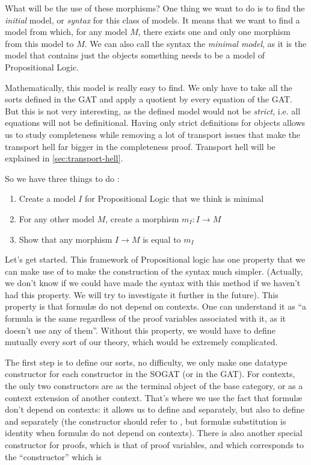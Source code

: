 \documentclass[10pt,a4paper]{article}
\begin{document}
			What will be the use of these morphisms? One thing we want to do is to find the \emph{initial} model, or \emph{syntax} for this class of models. It means that we want to find a model from which, for any model $M$, there exists one and only one morphism from this model to $M$. We can also call the syntax the \emph{minimal model}, as it is the model that contains just the objects something needs to be a model of Propositional Logic.
			
			Mathematically, this model is really easy to find. We only have to take all the sorts defined in the GAT and apply a quotient by every equation of the GAT. But this is not very interesting, as the defined model would not be \emph{strict}, i.e. all equations will not be definitional. Having only strict definitions for objects allows us to study completeness while removing a lot of transport issues that make the transport hell far bigger in the completeness proof. Transport hell will be explained in \autoref{sec:transport-hell}.
			
			So we have three things to do :
			\begin{enumerate}
				\setlength{\itemsep}{-1ex}
				\item Create a model $I$ for Propositional Logic that we think is minimal
				\item For any other model $M$, create a morphism $m_I : I \to M$
				\item Show that any morphism $I \to M$ is equal to $m_I$
			\end{enumerate}
		
			Let's get started. This framework of Propositional logic has one property that we can make use of to make the construction of the syntax much simpler. (Actually, we don't know if we could have made the syntax with this method if we haven't had this property. We will try to investigate it further in the future). This property is that formulæ do not depend on contexts. One can understand it as \enquote{a formula is the same regardless of the proof variables associated with it, as it doesn't use any of them}. Without this property, we would have to define mutually every sort of our theory, which would be extremely complicated.
			
			The first step is to define our sorts, no difficulty, we only make one datatype constructor for each constructor in the SOGAT (or in the GAT). For contexts, the only two constructors are as the terminal object of the base category, or as a context extension of another context. That's where we use the fact that formulæ don't depend on contexts: it allows us to define  and  separately, but also to define  and  separately (the  constructor should refer to , but formulæ substitution is identity when formulæ do not depend on contexts). There is also another special constructor for proofs, which is that of proof variables, and which corresponds to the \enquote{constructor} which is 
			
\end{document}
